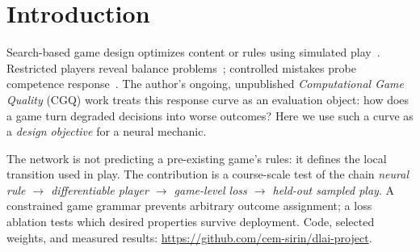 \documentclass{article}
\begin{document}

\printAffiliationsAndNotice{}

\begin{abstract}
Can we learn a game's mechanics from desired behavior rather than examples of
correct transitions? We study \emph{Mackerel Road}, a stochastic fish-delivery
race whose local neural network defines travel costs and events. Differentiable
planning trains this rule from objectives for viable deliveries, role balance,
competence response, and weather, without a transition teacher. A matched
four-stage ablation uses three optimizer seeds and 100 held-out maps per seed.
The full model retains viable deliveries and stochastic events, but its sampled
competence curve is steeper than the design target. Fitting a differentiable
objective is not the same as achieving its sampled-play counterpart or human
enjoyment.
\end{abstract}

\section{Introduction}

Search-based game design optimizes content or rules using simulated
play~\cite{togelius2011pcg,hom2007balanced}. Restricted players reveal balance
problems~\cite{jaffe2012balance}; controlled mistakes probe competence
response~\cite{graham2023mistakes}. The author's ongoing, unpublished
\emph{Computational Game Quality} (CGQ) work treats this response curve as an
evaluation object: how does a game turn degraded decisions into worse outcomes?
Here we use such a curve as a \emph{design objective} for a neural mechanic.

The network is not predicting a pre-existing game's rules: it defines the local
transition used in play. The contribution is a course-scale test of the chain
\emph{neural rule $\to$ differentiable player $\to$ game-level loss $\to$ held-out
sampled play}. A constrained game grammar prevents arbitrary outcome assignment;
a loss ablation tests which desired properties survive deployment. Code, selected
weights, and measured results: \url{https://github.com/cem-sirin/dlai-project}.
\end{document}
